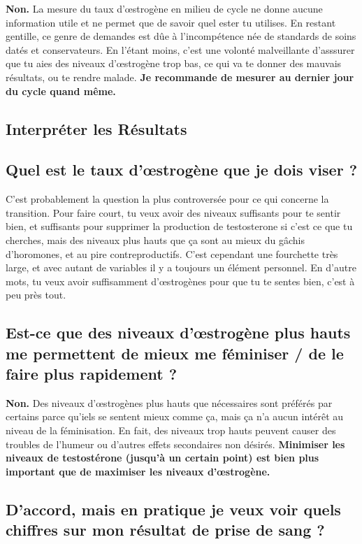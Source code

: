 \documentclass{article}
\begin{document}
\textbf{Non.} La mesure du taux d'œstrogène en milieu de cycle ne donne aucune information utile et ne permet que de savoir quel ester tu utilises. En restant gentille, ce genre de demandes est dûe à l'incompétence née de standards de soins datés et conservateurs. En l'étant moins, c'est une volonté malveillante d'asssurer que tu aies des niveaux d'œstrogène trop bas, ce qui va te donner des mauvais résultats, ou te rendre malade. \textbf{Je recommande de mesurer au dernier jour du cycle quand même.} 

\subsection*{Interpréter les Résultats}

\subsection{Quel est le taux d'œstrogène que je dois viser ?}

C'est probablement la question la plus controversée pour ce qui concerne la transition. Pour faire court, tu veux avoir des niveaux suffisants pour te sentir bien, et suffisants pour supprimer la production de testosterone si c'est ce que tu cherches, mais des niveaux plus hauts que ça sont au mieux du gâchis d'horomones, et au pire contreproductifs. C'est cependant une fourchette très large, et avec autant de variables il y a toujours un élément personnel. En d'autre mots, tu veux avoir suffisamment d'œstrogènes pour que tu te sentes bien, c'est à peu près tout.

\subsection{Est-ce que des niveaux d'œstrogène plus hauts me permettent de mieux me féminiser / de le faire plus rapidement ?}

\textbf{Non.} Des niveaux d'œstrogènes plus hauts que nécessaires sont préférés par certains parce qu'iels se sentent mieux comme ça, mais ça n'a aucun intérêt au niveau de la féminisation. En fait, des niveaux trop hauts peuvent causer des troubles de l'humeur ou d'autres effets secondaires non désirés. \textbf{Minimiser les niveaux de testostérone (jusqu'à un certain point) est bien plus important que de maximiser les niveaux d'œstrogène.}

\subsection{D'accord, mais en pratique je veux voir quels chiffres sur mon résultat de prise de sang ?}
\end{document}
